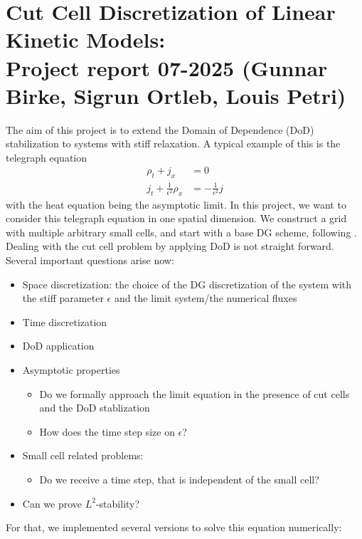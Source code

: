\documentclass[]{article}
\title{}
\author{}
\date{}
\begin{document}
\section*{Cut Cell Discretization of Linear Kinetic Models:\\ Project report 07-2025 (Gunnar Birke, Sigrun Ortleb, Louis Petri)}


The aim of this project is to extend the Domain of Dependence (DoD) stabilization to systems with stiff relaxation.  A typical example of this is the telegraph equation
\begin{equation}
\begin{split}
	\rho_t + j_x & = 0\\
	j_t + \frac{1}{\epsilon^2}\rho_x & = -\frac{1}{\epsilon^2} j
\end{split}
\end{equation}
with the heat equation being the asymptotic limit.
In this project, we want to consider this telegraph equation in one spatial dimension. We construct a grid with multiple arbitrary small cells, and start with a base DG scheme, following \cite{Jang}.
Dealing with the cut cell problem by applying DoD is not straight forward. Several important questions arise now:
\vspace{\baselineskip}
\begin{itemize}
\item Space discretization: the choice of the DG discretization of the system with the stiff parameter $\epsilon$ and the limit system/the numerical fluxes
\item Time discretization
\item DoD application
\item Asymptotic properties
\begin{itemize}
\item Do we formally approach the limit equation in the presence of cut cells and the DoD stablization
\item How does the time step size on  $\epsilon$?
\end{itemize}
\item Small cell related problems:
\begin{itemize}
	\item Do we receive a time step, that is independent of the small cell?
\end{itemize}
\item Can we prove $L^2$-stability?
\end{itemize}
\vspace{\baselineskip}
For that, we implemented several versions to solve this equation numerically:
\end{document}
